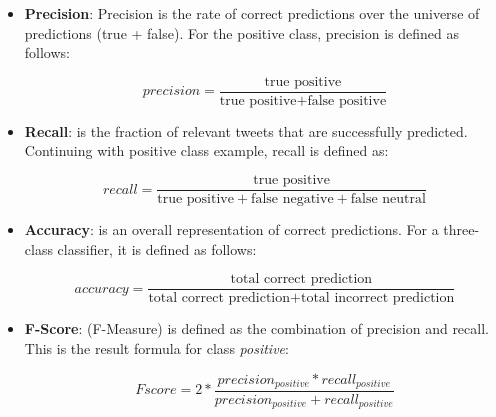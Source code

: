 \begin{itemize} 
\itemsep0em  

\item \textbf{Precision}: Precision is the rate of correct predictions over the universe of predictions (true + false). For the positive class, precision is defined as follows:
    
    \begin{equation}
        precision = \frac{\text{true positive}}{\text{true positive} + \text{false positive}} 
    \end{equation}
    
\item \textbf{Recall}: is the fraction of relevant tweets that are successfully predicted.  Continuing with positive class example, recall is defined as:

    \begin{equation}
        recall = \frac{\text{true positive}}{\text{true positive} + \text{false negative} + \text{false neutral}} 
    \end{equation}
    
\item \textbf{Accuracy}: is an overall representation of correct predictions. For a three-class classifier, it is defined as follows:

    \begin{equation}
        accuracy = \frac{\text{total correct prediction}}{\text{total correct prediction} + \text{total incorrect prediction}} 
    \end{equation}

\item \textbf{F-Score}: (F-Measure) is defined as the combination of precision and recall. This is the result formula for class \textit{positive}:

    \begin{equation}
        Fscore = 2 * \frac{precision_{positive} * recall_{positive}}{precision_{positive} + recall_{positive}} 
    \end{equation}

\end{itemize}

